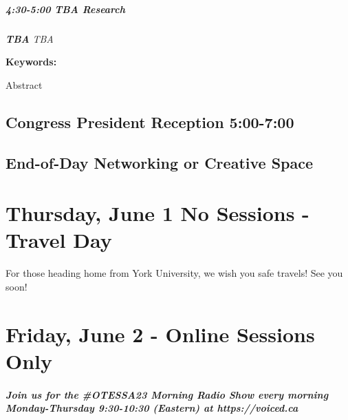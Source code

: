 \documentclass[
]{book}
\begin{document}
\begin{session}
\hypertarget{tba-research}{%
\paragraph*{\texorpdfstring{4:30-5:00 \textbar{} \textbf{TBA} \textbar{}
Research}{4:30-5:00 \textbar{} TBA \textbar{} Research}}\label{tba-research}}

\textbf{\emph{TBA}} \textbar{} \emph{TBA}

\textbf{Keywords:}

Abstract
\end{session}

\hypertarget{congress-president-reception-500-700}{%
\section{Congress President Reception \textbar{} 5:00-7:00}\label{congress-president-reception-500-700}}

\hypertarget{end-of-day-networking-or-creative-space}{%
\section*{End-of-Day Networking or Creative Space}\label{end-of-day-networking-or-creative-space}}

\hypertarget{thursday-june-1-no-sessions---travel-day}{%
\chapter{Thursday, June 1 \textbar{} No Sessions - Travel Day}\label{thursday-june-1-no-sessions---travel-day}}

For those heading home from York University, we wish you safe travels! See you soon!

\hypertarget{friday-june-2---online-sessions-only}{%
\chapter{Friday, June 2 - Online Sessions Only}\label{friday-june-2---online-sessions-only}}

\begin{protip}
\hypertarget{join-us-for-the-otessa23-morning-radio-show-every-morning-monday-thursday-930-1030-eastern-at-httpsvoiced.ca}{%
\paragraph{Join us for the \#OTESSA23 Morning Radio Show every morning
Monday-Thursday 9:30-10:30 (Eastern) at
https://voiced.ca}\label{join-us-for-the-otessa23-morning-radio-show-every-morning-monday-thursday-930-1030-eastern-at-httpsvoiced.ca}}
\end{protip}
\end{document}
